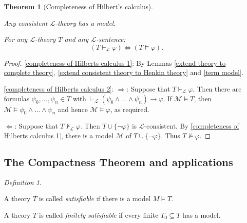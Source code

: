 \documentclass[a4paper, 11pt]{amsart}
\newtheorem{theorem}{Theorem}[subsection]
\theoremstyle{remark}
\newtheorem{definition}[definition]{Definition}
\newcommand{\cL}{\mathcal L}
\newcommand{\cM}{\mathcal M}
\newenvironment{enumerate-(1)}{\begin{enumerate}[label={\upshape (\arabic*)}, leftmargin=2pc]}{\end{enumerate}}
\begin{document}

\begin{theorem}[Completeness of Hilbert's calculus] \ 
\label{completeness of Hilberts calculus} 
\begin{enumerate-(1)} 
\item 
\label{completeness of Hilberts calculus 1} 
Any consistent $\cL$-theory has a model. 
\item 
\label{completeness of Hilberts calculus 2} 
For any $\cL$-theory $T$ and any $\cL$-sentence: 
$$ (T\vdash_\cL \varphi) \Longleftrightarrow (T\models \varphi) . $$ 
\end{enumerate-(1)} 
\end{theorem} 
\begin{proof} 
\ref{completeness of Hilberts calculus 1}: 
By Lemmas \ref{extend theory to complete theory}, \ref{extend consistent theory to Henkin theory} and \ref{term model}. 

\ref{completeness of Hilberts calculus 2}: 
$\Longrightarrow$: 
Suppose that $T\vdash_\cL \varphi$. 
Then there are formulas $\psi_0,\dots,\psi_n\in T$ with $\vdash_\cL (\psi_0\wedge \dots \wedge \psi_n)\rightarrow \varphi$. 
If $\cM\models T$, then $\cM \models \psi_0\wedge \dots \wedge \psi_n$ and hence $\cM \models \varphi$, as required. 

$\Longleftarrow$: 
Suppose that $T\not\vdash_\cL \varphi$. 
Then $T\cup \{ \neg\varphi\}$ is $\cL$-consistent. 
By \ref{completeness of Hilberts calculus 1}, there is a model $\cM$ of $T\cup \{ \neg\varphi\}$. 
Thus $T\not \models \varphi$. 
\end{proof} 






\subsection{The Compactness Theorem and applications} 




\begin{definition} \ 
\begin{enumerate-(1)} 
\item 
A theory $T$ is called \emph{satisfiable} if there is a model $M \models T$.  
\item 
A theory $T$ is called \emph{finitely satisfiable} if every finite $T_0\subseteq T$ has a model. 
\end{enumerate-(1)} 
\end{definition} 
\end{document}
